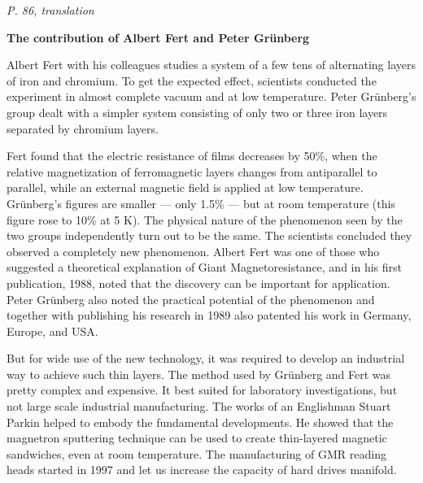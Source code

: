 \documentclass[a4paper, 12pt]{article}
\def\task#1{\begin{center}\it #1\end{center}}
\newif\ifcols
\begin{document}
\task{P. 86, translation}
\ifcols\begin{multicols}{2}\fi%
	\textbf{The contribution of Albert Fert and Peter Gr\"{u}nberg}

	Albert Fert with his colleagues studies a system of a few tens 
	of alternating layers of iron and chromium. To get the expected 
	effect, scientists conducted the experiment in almost complete 
	vacuum and at low temperature. Peter Gr\"{u}nberg's group dealt 
	with a simpler system consisting of only two or three iron 
	layers separated by chromium layers.

	Fert found that the electric resistance of films decreases by 
	50\%, when the relative magnetization of ferromagnetic layers 
	changes from antiparallel to parallel, while an external 
	magnetic field is applied at low temperature. Gr\"{u}nberg's 
	figures are smaller --- only 1.5\% --- but at room temperature 
	(this figure rose to 10\% at 5 K). The physical nature of the 
	phenomenon seen by the two groups independently turn out to be 
	the same. The scientists concluded they observed a completely 
	new phenomenon. Albert Fert was one of those who suggested 
	a theoretical explanation of Giant Magnetoresistance, and in his 
	first publication, 1988, noted that the discovery can be 
	important for application. Peter Gr\"{u}nberg also noted the 
	practical potential of the phenomenon and together with 
	publishing his research in 1989 also patented his work in 
	Germany, Europe, and USA.

	But for wide use of the new technology, it was required to 
	develop an industrial way to achieve such thin layers. The 
	method used by Gr\"{u}nberg and Fert was pretty complex and 
	expensive. It best suited for laboratory investigations, but not 
	large scale industrial manufacturing. The works of an Englishman 
	Stuart Parkin helped to embody the fundamental developments. He 
	showed that the magnetron sputtering technique can be used to 
	create thin-layered magnetic sandwiches, even at room 
	temperature. The manufacturing of GMR reading heads started in 
	1997 and let us increase the capacity of hard drives manifold.
\ifcols\end{multicols}\fi%
\end{document}
